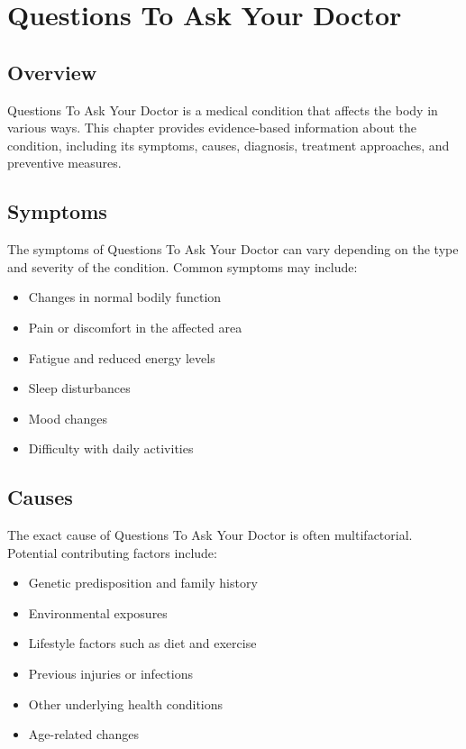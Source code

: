 \chapter{Questions To Ask Your Doctor}

\section*{Overview}
Questions To Ask Your Doctor is a medical condition that affects the body in various ways. This chapter provides evidence-based information about the condition, including its symptoms, causes, diagnosis, treatment approaches, and preventive measures.

\section*{Symptoms}
The symptoms of Questions To Ask Your Doctor can vary depending on the type and severity of the condition. Common symptoms may include:

\begin{itemize}
\item Changes in normal bodily function
\item Pain or discomfort in the affected area
\item Fatigue and reduced energy levels
\item Sleep disturbances
\item Mood changes
\item Difficulty with daily activities
\end{itemize}

\section*{Causes}
The exact cause of Questions To Ask Your Doctor is often multifactorial. Potential contributing factors include:

\begin{itemize}
\item Genetic predisposition and family history
\item Environmental exposures
\item Lifestyle factors such as diet and exercise
\item Previous injuries or infections
\item Other underlying health conditions
\item Age-related changes
\end{itemize}

